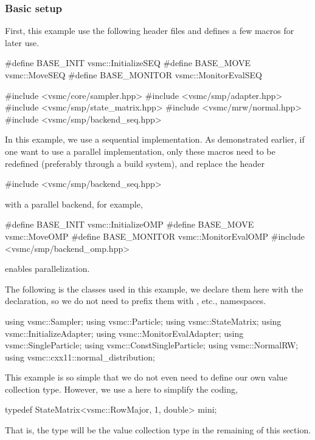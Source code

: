 \subsubsection{Basic setup}
\label{ssub:Basic setup}

First, this example use the following header files and defines a few macros
for later use.
\begin{cppcode}
#define BASE_INIT    vsmc::InitializeSEQ
#define BASE_MOVE    vsmc::MoveSEQ
#define BASE_MONITOR vsmc::MonitorEvalSEQ

#include <vsmc/core/sampler.hpp>
#include <vsmc/smp/adapter.hpp>
#include <vsmc/smp/state_matrix.hpp>
#include <vsmc/mrw/normal.hpp>
#include <vsmc/smp/backend_seq.hpp>
\end{cppcode}
In this example, we use a sequential implementation. As demonstrated earlier,
if one want to use a parallel implementation, only these macros need to be
redefined (preferably through a build system), and replace the header
\begin{cppcode}
#include <vsmc/smp/backend_seq.hpp>
\end{cppcode}
with a parallel backend, for example,
\begin{cppcode}
#define BASE_INIT    vsmc::InitializeOMP
#define BASE_MOVE    vsmc::MoveOMP
#define BASE_MONITOR vsmc::MonitorEvalOMP
#include <vsmc/smp/backend_omp.hpp>
\end{cppcode}
enables \openmp parallelization.

The following is the \vsmc classes used in this example, we declare them here
with the  declaration, so we do not need to prefix them with
, etc., namespaces.
\begin{cppcode}
using vsmc::Sampler;
using vsmc::Particle;
using vsmc::StateMatrix;
using vsmc::InitializeAdapter;
using vsmc::MonitorEvalAdapter;
using vsmc::SingleParticle;
using vsmc::ConstSingleParticle;
using vsmc::NormalRW;
using vsmc::cxx11::normal_distribution;
\end{cppcode}

This example is so simple that we do not even need to define our own value
collection type. However, we use a  here to simplify the
coding,
\begin{cppcode}
typedef StateMatrix<vsmc::RowMajor, 1, double> mini;
\end{cppcode}
That is, the type  will be the value collection type in the
remaining of this section.

